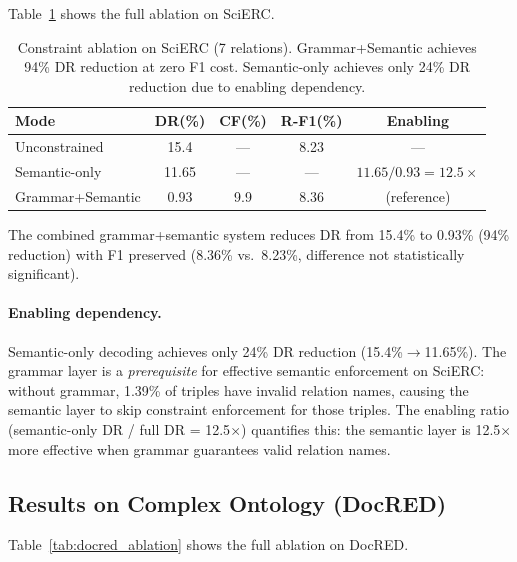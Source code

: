 \documentclass[11pt,a4paper]{article}
\begin{document}
Table~\ref{tab:scierc_ablation} shows the full ablation on SciERC.

\begin{table}[t]
\centering
\caption{Constraint ablation on SciERC (7 relations). Grammar+Semantic achieves 94\% DR reduction at zero F1 cost. Semantic-only achieves only 24\% DR reduction due to enabling dependency.}
\label{tab:scierc_ablation}
\begin{tabular}{lcccc}
\toprule
\textbf{Mode} & \textbf{DR(\%)} & \textbf{CF(\%)} & \textbf{R-F1(\%)} & \textbf{Enabling} \\
\midrule
Unconstrained    & 15.4  & ---  & 8.23 & --- \\
Semantic-only    & 11.65 & ---  & ---  & $11.65/0.93{=}12.5\times$ \\
Grammar+Semantic & 0.93  & 9.9  & 8.36 & (reference) \\
\bottomrule
\end{tabular}
\end{table}

The combined grammar+semantic system reduces DR from 15.4\% to 0.93\% (94\% reduction) with F1 preserved (8.36\% vs.\ 8.23\%, difference not statistically significant).

\paragraph{Enabling dependency.}
Semantic-only decoding achieves only 24\% DR reduction (15.4\%${\to}$11.65\%).
The grammar layer is a \emph{prerequisite} for effective semantic enforcement on SciERC: without grammar, 1.39\% of triples have invalid relation names, causing the semantic layer to skip constraint enforcement for those triples.
The enabling ratio (semantic-only DR / full DR = 12.5$\times$) quantifies this: the semantic layer is 12.5$\times$ more effective when grammar guarantees valid relation names.

\subsection{Results on Complex Ontology (DocRED)}
\label{sec:docred_results}

Table~\ref{tab:docred_ablation} shows the full ablation on DocRED.
\end{document}
